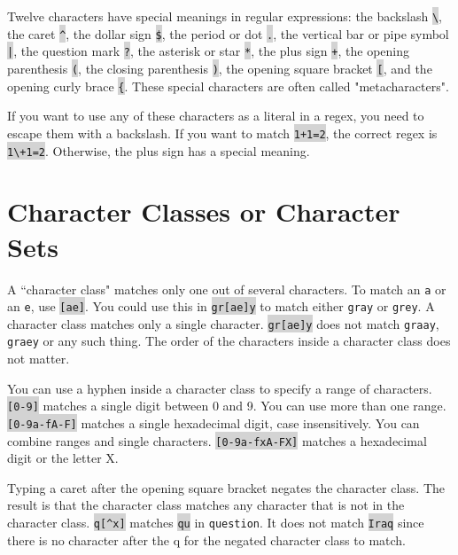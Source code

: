 Twelve characters have special meanings in regular expressions: the backslash \colorbox{lightgray}{\texttt{\textbackslash}}, the caret \colorbox{lightgray}{\texttt{\^{}}}, the dollar sign \colorbox{lightgray}{\texttt{\$}}, the period or dot \colorbox{lightgray}{\texttt{.}}, the vertical bar or pipe symbol \colorbox{lightgray}{\texttt{|}}, the question mark \colorbox{lightgray}{\texttt{?}}, the asterisk or star \colorbox{lightgray}{\texttt{*}}, the plus sign \colorbox{lightgray}{\texttt{+}}, the opening parenthesis \colorbox{lightgray}{\texttt{(}}, the closing parenthesis \colorbox{lightgray}{\texttt{)}}, the opening square bracket \colorbox{lightgray}{\texttt{[}}, and the opening curly brace \colorbox{lightgray}{\texttt{\{}}. These special characters are often called "metacharacters".


If you want to use any of these characters as a literal in a regex, you need to escape them with a backslash. If you want to match \colorbox{lightgray}{\texttt{1+1=2}}, the correct regex is \colorbox{lightgray}{\texttt{1\textbackslash +1=2}}. Otherwise, the plus sign has a special meaning.





\chapter{Character Classes or Character Sets}

A ``character class" matches only one out of several characters. To match an \texttt{a} or an \texttt{e}, use \colorbox{lightgray}{\texttt{[ae]}}. You could use this in \colorbox{lightgray}{\texttt{gr[ae]y}} to match either \texttt{gray} or \texttt{grey}. A character class matches only a single character. \colorbox{lightgray}{\texttt{gr[ae]y}} does not match \texttt{graay}, \texttt{graey} or any such thing. The order of the characters inside a character class does not matter.


You can use a hyphen inside a character class to specify a range of characters. \colorbox{lightgray}{\texttt{[0-9]}} matches a single digit between 0 and 9. You can use more than one range. \colorbox{lightgray}{\texttt{[0-9a-fA-F]}} matches a single hexadecimal digit, case insensitively. You can combine ranges and single characters. \colorbox{lightgray}{\texttt{[0-9a-fxA-FX]}} matches a hexadecimal digit or the letter \textsf{X}.


Typing a caret after the opening square bracket negates the character class. The result is that the character class matches any character that is not in the character class. \colorbox{lightgray}{\texttt{q[\^{}x]}} matches \colorbox{lightgray}{\texttt{qu}} in \texttt{question}. It does not match \colorbox{lightgray}{\texttt{Iraq}} since there is no character after the \textsf{q} for the negated character class to match.


